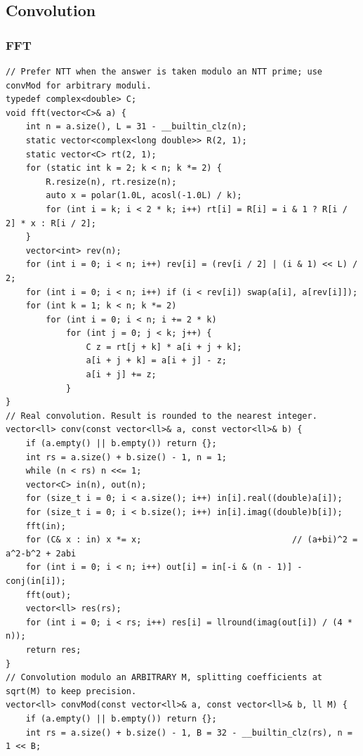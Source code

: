 \documentclass[9pt,a4paper,twocolumn]{extarticle}
\begin{document}
\subsection{Convolution}

\filbreak
\subsubsection{FFT}
\nopagebreak
\begin{lstlisting}
// Prefer NTT when the answer is taken modulo an NTT prime; use convMod for arbitrary moduli.
typedef complex<double> C;
void fft(vector<C>& a) {
    int n = a.size(), L = 31 - __builtin_clz(n);
    static vector<complex<long double>> R(2, 1);
    static vector<C> rt(2, 1);
    for (static int k = 2; k < n; k *= 2) {
        R.resize(n), rt.resize(n);
        auto x = polar(1.0L, acosl(-1.0L) / k);
        for (int i = k; i < 2 * k; i++) rt[i] = R[i] = i & 1 ? R[i / 2] * x : R[i / 2];
    }
    vector<int> rev(n);
    for (int i = 0; i < n; i++) rev[i] = (rev[i / 2] | (i & 1) << L) / 2;
    for (int i = 0; i < n; i++) if (i < rev[i]) swap(a[i], a[rev[i]]);
    for (int k = 1; k < n; k *= 2)
        for (int i = 0; i < n; i += 2 * k)
            for (int j = 0; j < k; j++) {
                C z = rt[j + k] * a[i + j + k];
                a[i + j + k] = a[i + j] - z;
                a[i + j] += z;
            }
}
// Real convolution. Result is rounded to the nearest integer.
vector<ll> conv(const vector<ll>& a, const vector<ll>& b) {
    if (a.empty() || b.empty()) return {};
    int rs = a.size() + b.size() - 1, n = 1;
    while (n < rs) n <<= 1;
    vector<C> in(n), out(n);
    for (size_t i = 0; i < a.size(); i++) in[i].real((double)a[i]);
    for (size_t i = 0; i < b.size(); i++) in[i].imag((double)b[i]);
    fft(in);
    for (C& x : in) x *= x;                              // (a+bi)^2 = a^2-b^2 + 2abi
    for (int i = 0; i < n; i++) out[i] = in[-i & (n - 1)] - conj(in[i]);
    fft(out);
    vector<ll> res(rs);
    for (int i = 0; i < rs; i++) res[i] = llround(imag(out[i]) / (4 * n));
    return res;
}
// Convolution modulo an ARBITRARY M, splitting coefficients at sqrt(M) to keep precision.
vector<ll> convMod(const vector<ll>& a, const vector<ll>& b, ll M) {
    if (a.empty() || b.empty()) return {};
    int rs = a.size() + b.size() - 1, B = 32 - __builtin_clz(rs), n = 1 << B;

\end{lstlisting}
\end{document}
